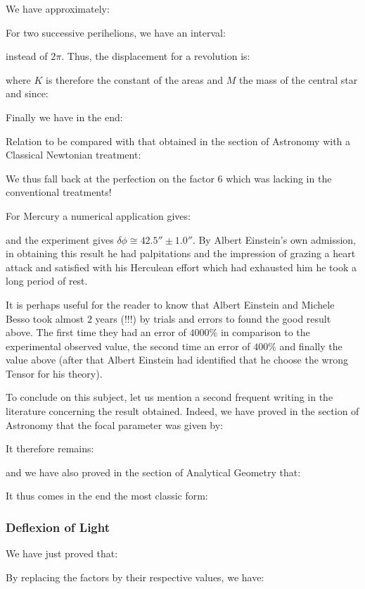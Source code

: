 	We have approximately:
	
	For two successive perihelions, we have an interval:
	
	instead of $2\pi$. Thus, the displacement for a revolution is:
	
	where $K$ is therefore the constant of the areas and $M$ the mass of the central star and since:
	
	Finally we have in the end:
	
	Relation to be compared with that obtained in the section of Astronomy with a Classical Newtonian treatment:
	
	We thus fall back at the perfection on the factor $6$ which was lacking in the conventional treatments!

	For Mercury a numerical application gives:
	
	and the experiment gives $\delta\phi\cong 42.5''\pm 1.0''$. By Albert Einstein's own admission, in obtaining this result he had palpitations and the impression of grazing a heart attack and satisfied with his Herculean effort which had exhausted him he took a long period of rest.
	\begin{tcolorbox}[title=Remark,colframe=black,arc=10pt]
	It is perhaps useful for the reader to know that Albert Einstein and Michele Besso took almost $2$ years (!!!) by trials and errors to found the good result above. The first time they had an error of $4000\%$ in comparison to the experimental observed value, the second time an error of $400\%$ and finally the value above (after that Albert Einstein had identified that he choose the wrong Tensor for his theory).
	\end{tcolorbox}
	To conclude on this subject, let us mention a second frequent writing in the literature concerning the result obtained. Indeed, we have proved in the section of Astronomy that the focal parameter was given by:
	
	It therefore remains:
	
	and we have also proved in the section of Analytical Geometry that:
	
	It thus comes in the end the most classic form:
	
	
	\subsubsection{Deflexion of Light}
	We have just proved that:
	
	By replacing the factors by their respective values, we have:
	
